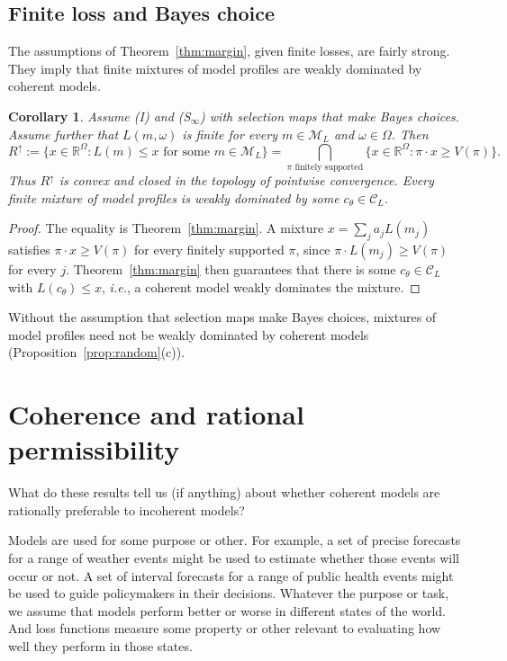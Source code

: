 \documentclass[11pt]{article}
\newtheorem{corollary}[theorem]{Corollary}
\theoremstyle{definition}
\theoremstyle{remark}
\newcommand{\R}{\mathbb R}
\newcommand{\M}{\mathcal M}
\newcommand{\C}{\mathcal C}
\begin{document}
\subsection{Finite loss and Bayes choice}\label{sec:convexconsequence}
The assumptions of Theorem~\ref{thm:margin}, given finite losses, are fairly strong. They imply that finite mixtures of model profiles are weakly dominated by coherent models.


\begin{corollary}\label{cor:upperconvex}
Assume (I) and (S$_\infty$) with selection maps that make Bayes choices. Assume further that $L(m,\omega)$ is finite for every $m\in\M_L$ and $\omega\in\Omega$. Then
\[
 R^\uparrow:=\{x\in\R^\Omega:L(m)\le x\text{ for some }m\in\M_L\}
 =\bigcap_{\pi\text{ finitely supported}}
 \{x\in\R^\Omega:\pi\cdot x\ge V(\pi)\}.
\]
Thus $R^\uparrow$ is convex and closed in the topology of pointwise convergence. Every finite mixture of model profiles is weakly dominated by some $c_\theta\in\C_L$.
\end{corollary}
\begin{proof}
The equality is Theorem~\ref{thm:margin}. A mixture $x=\sum_j a_jL(m_j)$ satisfies $\pi\cdot x\ge V(\pi)$ for every finitely supported $\pi$, since $\pi\cdot L(m_j)\ge V(\pi)$ for every $j$. Theorem~\ref{thm:margin} then guarantees that there is some $c_\theta\in\C_L$ with $L(c_\theta)\le x$, \textit{i.e.}, a coherent model weakly dominates the mixture.
\end{proof}
Without the assumption that selection maps make Bayes choices, mixtures of model profiles need not be weakly dominated by coherent models (Proposition~\ref{prop:random}(c)).



\section{Coherence and rational permissibility}\label{sec:argument}

What do these results tell us (if anything) about whether coherent models are rationally preferable to incoherent models?

Models are used for some purpose or other. For example, a set of precise forecasts for a range of weather events might be used to estimate whether those events will occur or not. A set of interval forecasts for a range of public health events might be used to guide policymakers in their decisions. Whatever the purpose or task, we assume that models perform better or worse in different states of the world. And loss functions measure some property or other relevant to evaluating how well they perform in those states. 
\end{document}
